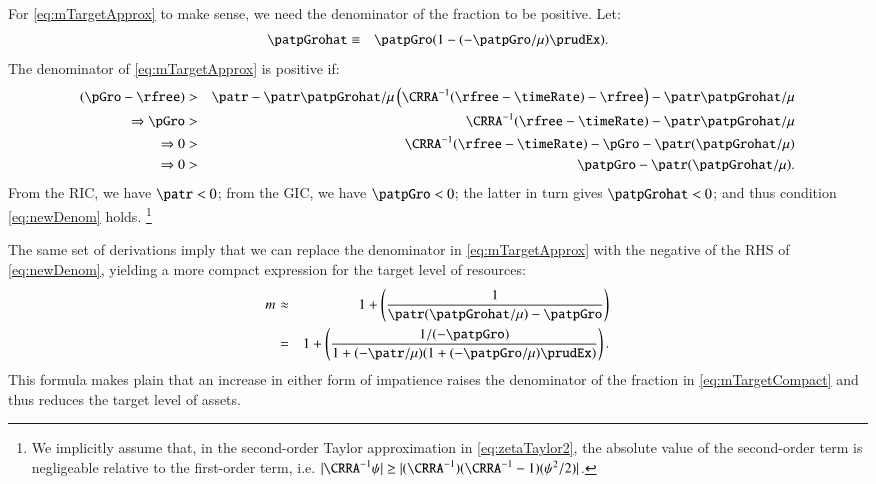 For \eqref{eq:mTargetApprox} to make sense, we need
the denominator of the fraction to be positive. Let:
\begin{eqnarray}
  \patpGrohat & \equiv & \patpGro(1-(-\patpGro/\urate)\prudEx)
.
\end{eqnarray}
The denominator of \eqref{eq:mTargetApprox} is positive if:
\begin{eqnarray}
  (\pGro - \rfree) & > & \patr - \patr\patpGrohat/\urate \notag
\left(\CRRA^{-1}(\rfree-\timeRate)-\rfree\right)-  \patr\patpGrohat/\urate \notag
\\ \Rightarrow \pGro & > & \CRRA^{-1}(\rfree-\timeRate)-  \patr\patpGrohat/\urate \notag
\\ \Rightarrow 0 & > & \CRRA^{-1}(\rfree-\timeRate) - \pGro -  \patr(\patpGrohat/\urate) \notag
\\ \Rightarrow 0 & > & \patpGro -  \patr(\patpGrohat/\urate) \label{eq:newDenom}
.
\end{eqnarray}
From the RIC, we have $\patr<0$; from the GIC, we have $\patpGro<0$; the latter in turn gives $\patpGrohat < 0$; and thus condition \eqref{eq:newDenom} holds.
\footnote{We implicitly assume that, in the second-order Taylor approximation in \eqref{eq:zetaTaylor2}, the absolute value of the second-order term is negligeable relative to the first-order term, i.e. $|\CRRA^{-1} \aleph | \geq |(\CRRA^{-1})(\CRRA^{-1}-1)(\aleph^{2}/2)|$.}

The same set of derivations imply that we can
replace the denominator in \eqref{eq:mTargetApprox} with the negative
of the RHS of \eqref{eq:newDenom}, yielding a more compact expression
for the target level of resources:
\begin{eqnarray} 
 \mTarg^{\null} & \approx & 1 + \left(\frac{1}{\patr(\patpGrohat/\urate) - \patpGro }\right) \notag
\\ & = & 1 + \left(\frac{1/(-\patpGro)}{1+(-\patr/\urate)(1+(-\patpGro/\urate)\prudEx)  }\right) \label{eq:mTargetCompact}
.
\end{eqnarray}
This formula makes plain that an
increase in either form of impatience raises the denominator of the 
fraction in 
\eqref{eq:mTargetCompact} and thus reduces the target level of assets.

